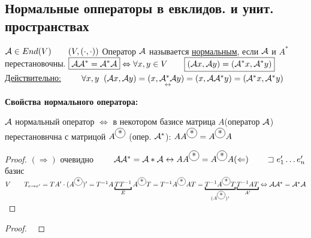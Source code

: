 \documentclass[../main.tex]{subfiles}
\begin{document}
	\subsection{Нормальные опператоры в евклидов. и унит. пространствах}
	\begin{defin}
		$\A \in End(V) \Space (V, (\cdot, \cdot))$\n 
		Оператор $\mathcal{A}$ называется \underline{нормальным}, если $\mathcal{A}$ и $A^*$ перестановочны.\n
		$\boxed{\A \A^* = \A^* \A} \Leftrightarrow \forall
		 x, y \in V \Space \boxed{(\A x, \A y) = (\A^* x, \A^* y)}$\n 
		 \underline{Действительно:} $\Space \forall x, y \; \; (\A x, \A y) = (x, \underset{\leftrightarrow}{\A^* \A} y) = (x, \A \A^* y) = (\A^* x, \A^* y)$
	\end{defin}
	\textbf{Свойства нормального оператора:}\
	\begin{mylist}
		\item $\mathcal{A}$ нормальный оператор $\Leftrightarrow$ в некотором базисе матрица $A$(оператор $\mathcal{A}$) перестановнчна с матрицой $A^{\circled *}$ (опер. $\mathcal{A}^*$): $A A^{\circled *} = A^{\circled *} A$
		\begin{proof}
			$(\Rightarrow)$ очевидно $\Space \A \A^* = \A* \A \leftrightarrow A A^{\circled *} = A^{\circled *} A\n 
			(\Leftarrow) \Space \pu e'_1 \ldots e'_n$ базис $V \Space T_{e\rightarrow e'} = T \n 
			A' \cdot (A^{\circled *})' = T^{-1} A \underbracket{T T^{-1}}_E A^{\circled *} T = T^{-1} A^{\circled *} A T = \underbracket{T^{-1} A^{\circled *} T}_{(A^{\circled *})'} \underbracket{T^{-1} A T}_{A'}\n 
			\Leftrightarrow \A \A^* = \A^* \A$
		\end{proof}
		\item {}
		\begin{proof}
			\
\end{proof}
\end{mylist}
\end{document}
